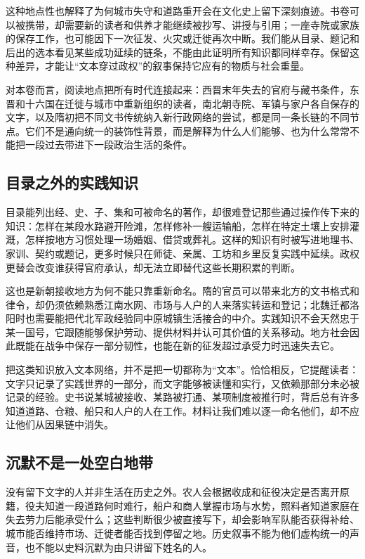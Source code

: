 这种地点性也解释了为何城市失守和道路重开会在文化史上留下深刻痕迹。书卷可以被携带，却需要新的读者和供养才能继续被抄写、讲授与引用；一座寺院或家族的保存工作，也可能因下一次征发、火灾或迁徙再次中断。我们能从目录、题记和后出的选本看见某些成功延续的链条，不能由此证明所有知识都同样幸存。保留这种差异，才能让“文本穿过政权”的叙事保持它应有的物质与社会重量。

对本卷而言，阅读地点把所有时代连接起来：西晋末年失去的官府与藏书条件，东晋和十六国在迁徙与城市中重新组织的读者，南北朝寺院、军镇与家户各自保存的文字，以及隋初把不同文书传统纳入新行政网络的尝试，都是同一条长链的不同节点。它们不是通向统一的装饰性背景，而是解释为什么人们能够、也为什么常常不能把一段过去带进下一段政治生活的条件。

\subsection{目录之外的实践知识}

目录能列出经、史、子、集和可被命名的著作，却很难登记那些通过操作传下来的知识：怎样在某段水路避开险滩，怎样修补一艘运输船，怎样在特定土壤上安排灌溉，怎样按地方习惯处理一场婚姻、借贷或葬礼。这样的知识有时被写进地理书、家训、契约或题记，更多时候只在师徒、亲属、工坊和乡里反复实践中延续。政权更替会改变谁获得官府承认，却无法立即替代这些长期积累的判断。

这也是新朝接收地方为何不能只靠重新命名。隋的官员可以带来北方的文书格式和律令，却仍须依赖熟悉江南水网、市场与人户的人来落实转运和登记；北魏迁都洛阳时也需要能把代北军政经验同中原城镇生活接合的中介。实践知识不会天然忠于某一国号，它跟随能够保护劳动、提供材料并认可其价值的关系移动。地方社会因此既能在战争中保存一部分韧性，也能在新的征发超过承受力时迅速失去它。

把这类知识放入文本网络，并不是把一切都称为“文本”。恰恰相反，它提醒读者：文字只记录了实践世界的一部分，而文字能够被读懂和实行，又依赖那部分未必被记录的经验。史书说某城被接收、某路被打通、某项制度被推行时，背后总有许多知道道路、仓粮、船只和人户的人在工作。材料让我们难以逐一命名他们，却不应让他们从因果链中消失。

\subsection{沉默不是一处空白地带}

没有留下文字的人并非生活在历史之外。农人会根据收成和征役决定是否离开原籍，役夫知道一段道路何时难行，船户和商人掌握市场与水势，照料者知道家庭在失去劳力后能承受什么；这些判断很少被直接写下，却会影响军队能否获得补给、城市能否维持市场、迁徙者能否找到停留之地。历史叙事不能为他们虚构统一的声音，也不能以史料沉默为由只讲留下姓名的人。

